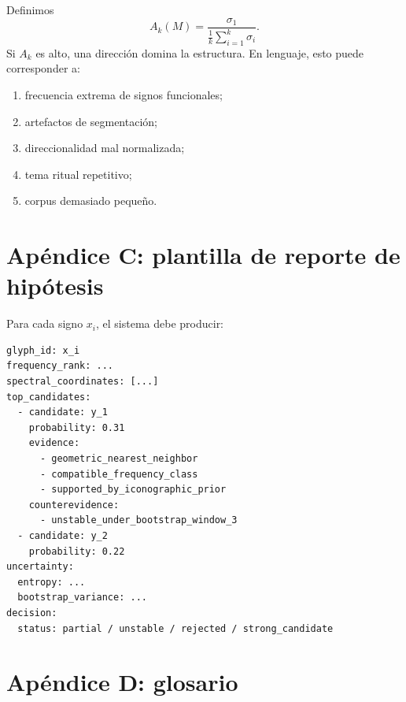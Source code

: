 \documentclass[11pt,a4paper]{article}
\newcommand{\1}{\mathbf{1}}
\numberwithin{equation}{section}
\begin{document}
Definimos
\[
    A_k(M)=
    \frac{\sigma_1}
    {\frac{1}{k}\sum_{i=1}^{k}\sigma_i}.
\]
Si \(A_k\) es alto, una dirección domina la estructura. En lenguaje, esto puede corresponder a:
\begin{enumerate}[label=(\roman*)]
    \item frecuencia extrema de signos funcionales;
    \item artefactos de segmentación;
    \item direccionalidad mal normalizada;
    \item tema ritual repetitivo;
    \item corpus demasiado pequeño.
\end{enumerate}

\section{Apéndice C: plantilla de reporte de hipótesis}

Para cada signo \(x_i\), el sistema debe producir:

\begin{verbatim}
glyph_id: x_i
frequency_rank: ...
spectral_coordinates: [...]
top_candidates:
  - candidate: y_1
    probability: 0.31
    evidence:
      - geometric_nearest_neighbor
      - compatible_frequency_class
      - supported_by_iconographic_prior
    counterevidence:
      - unstable_under_bootstrap_window_3
  - candidate: y_2
    probability: 0.22
uncertainty:
  entropy: ...
  bootstrap_variance: ...
decision:
  status: partial / unstable / rejected / strong_candidate
\end{verbatim}

\section{Apéndice D: glosario}
\end{document}

